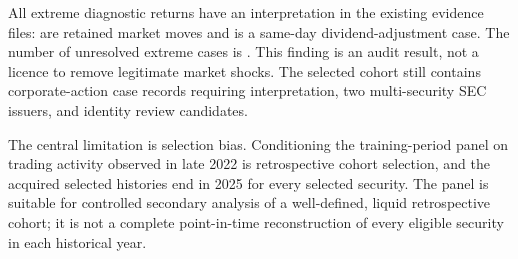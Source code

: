 All \ExtremeReturns{} extreme diagnostic returns have an interpretation in the
existing evidence files: \RetainedExtremeMarketMoves{} are retained market
moves and \SameDayDividendAdjustmentCases{} is a same-day dividend-adjustment
case. The number of unresolved extreme cases is
\UnresolvedExtremeCases{}. This finding is an audit result, not a licence to
remove legitimate market shocks. The selected cohort still contains
\CorporateActionCaseRecords{} corporate-action case records requiring
interpretation, two multi-security SEC issuers, and
\IdentityReviewCandidates{} identity review candidates.

The central limitation is selection bias. Conditioning the training-period
panel on trading activity observed in late 2022 is retrospective cohort
selection, and the acquired selected histories end in 2025 for every selected
security. The panel is suitable for controlled secondary analysis of a
well-defined, liquid retrospective cohort; it is not a complete point-in-time
reconstruction of every eligible security in each historical year.
